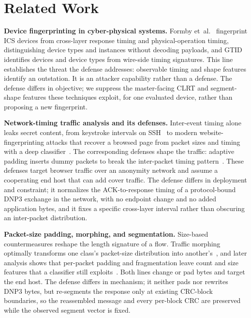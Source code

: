 \section{Related Work}
\label{sec:related}

\noindent\textbf{Device fingerprinting in cyber-physical systems.} Formby et~al.~\cite{formby2016}
fingerprint ICS devices from cross-layer response timing and physical-operation timing, distinguishing
device types and instances without decoding payloads, and GTID~\cite{gtid2015} identifies devices and
device types from wire-side timing signatures. This line establishes the threat the defense addresses:
observable timing and shape features identify an outstation. It is an attacker capability rather than a
defense. The defense differs in objective; we suppress the master-facing CLRT and segment-shape features
these techniques exploit, for one evaluated device, rather than proposing a new fingerprint.

\noindent\textbf{Network-timing traffic analysis and its defenses.} Inter-event timing alone leaks
secret content, from keystroke intervals on SSH~\cite{song2001} to modern website-fingerprinting
attacks that recover a browsed page from packet sizes and timing with a deep
classifier~\cite{sirinam2018}. The corresponding defenses shape the traffic: adaptive padding inserts
dummy packets to break the inter-packet timing pattern~\cite{juarez2016}. These defenses target
browser traffic over an anonymity network and assume a cooperating end host that can add cover
traffic. The defense differs in deployment and constraint; it normalizes the ACK-to-response timing of a
protocol-bound DNP3 exchange in the network, with no endpoint change and no added application bytes,
and it fixes a specific cross-layer interval rather than obscuring an inter-packet distribution.

\noindent\textbf{Packet-size padding, morphing, and segmentation.} Size-based countermeasures reshape
the length signature of a flow. Traffic morphing optimally transforms one class's packet-size
distribution into another's~\cite{wright2009}, and later analysis shows that per-packet padding and
fragmentation leave count and size features that a classifier still exploits~\cite{dyer2012}. Both
lines change or pad bytes and target the end host. The defense differs in mechanism; it neither pads nor
rewrites DNP3 bytes, but re-segments the response only at existing CRC-block boundaries, so the
reassembled message and every per-block CRC are preserved while the observed segment vector is fixed.

